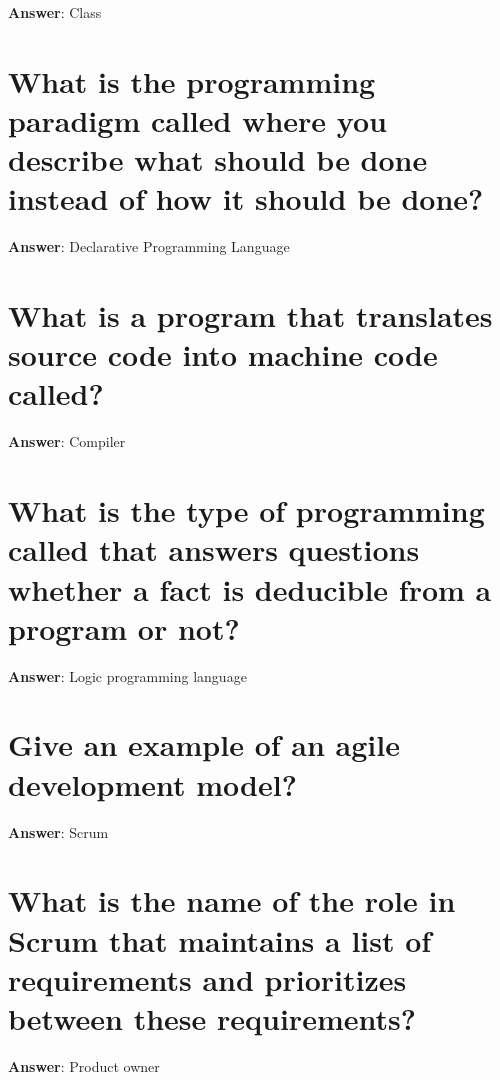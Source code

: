 \documentclass[a4paper,11pt,oneside]{book}
\begin{document}
\begin{sloppypar}
\label{q:36:sa:en:True}

\textbf{Answer}: Class



\section{What is the programming paradigm called where you describe what should be done instead of how it should be done?}

\label{q:37:sa:en:True}

\textbf{Answer}: Declarative Programming Language



\section{What is a program that translates source code into machine code called?}

\label{q:38:sa:en:True}

\textbf{Answer}: Compiler



\section{What is the type of programming called that answers questions whether a fact is deducible from a program or not?}

\label{q:39:sa:en:True}

\textbf{Answer}: Logic programming language



\section{Give an example of an agile development model?}

\label{q:40:sa:en:True}

\textbf{Answer}: Scrum



\section{What is the name of the role in Scrum that maintains a list of requirements and prioritizes between these requirements?}

\label{q:41:sa:en:True}

\textbf{Answer}: Product owner




\end{sloppypar}
\end{document}
